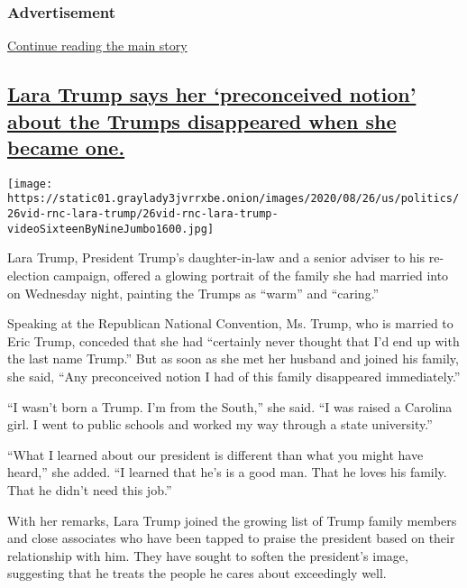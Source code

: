 \hypertarget{advertisement-1}{%
\subsubsection{Advertisement}\label{advertisement-1}}

\protect\hyperlink{after-dfp-ad-mid2}{Continue reading the main story}

\hypertarget{lara-trump-says-her-preconceived-notion-about-the-trumps-disappeared-when-she-became-one}{%
\subsection{\texorpdfstring{\protect\hyperlink{lara-trump-says-her-preconceived-notion-about-the-trumps-disappeared-when-she-became-one}{Lara
Trump says her `preconceived notion' about the Trumps disappeared when
she became
one.}}{Lara Trump says her `preconceived notion' about the Trumps disappeared when she became one.}}\label{lara-trump-says-her-preconceived-notion-about-the-trumps-disappeared-when-she-became-one}}

\texttt{[image: https://static01.graylady3jvrrxbe.onion/images/2020/08/26/us/politics/26vid-rnc-lara-trump/26vid-rnc-lara-trump-videoSixteenByNineJumbo1600.jpg]}

Lara Trump, President Trump's daughter-in-law and a senior adviser to
his re-election campaign, offered a glowing portrait of the family she
had married into on Wednesday night, painting the Trumps as ``warm'' and
``caring.''

Speaking at the Republican National Convention, Ms. Trump, who is
married to Eric Trump, conceded that she had ``certainly never thought
that I'd end up with the last name Trump.'' But as soon as she met her
husband and joined his family, she said, ``Any preconceived notion I had
of this family disappeared immediately.''

``I wasn't born a Trump. I'm from the South,'' she said. ``I was raised
a Carolina girl. I went to public schools and worked my way through a
state university.''

``What I learned about our president is different than what you might
have heard,'' she added. ``I learned that he's is a good man. That he
loves his family. That he didn't need this job.''

With her remarks, Lara Trump joined the growing list of Trump family
members and close associates who have been tapped to praise the
president based on their relationship with him. They have sought to
soften the president's image, suggesting that he treats the people he
cares about exceedingly well.

